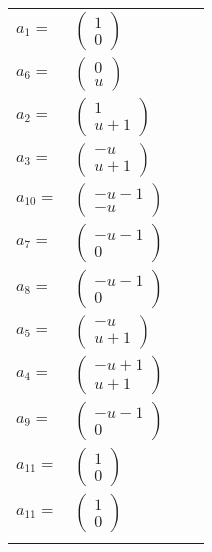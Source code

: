 \documentclass[1p]{elsarticle_modified}
\theoremstyle{definition}
\begin{document}
\begin{tabular}{m{7pt} m{180pt} m{7pt} m{180pt} }
\flushright $a_{1}=$&$\begin{pmatrix}1\\0\end{pmatrix}$ \\
\flushright $a_{6}=$&$\begin{pmatrix}0\\u\end{pmatrix}$ \\
\flushright $a_{2}=$&$\begin{pmatrix}1\\u+1\end{pmatrix}$ \\
\flushright $a_{3}=$&$\begin{pmatrix}- u\\u+1\end{pmatrix}$ \\
\flushright $a_{10}=$&$\begin{pmatrix}- u-1\\- u\end{pmatrix}$ \\
\flushright $a_{7}=$&$\begin{pmatrix}- u-1\\0\end{pmatrix}$ \\
\flushright $a_{8}=$&$\begin{pmatrix}- u-1\\0\end{pmatrix}$ \\
\flushright $a_{5}=$&$\begin{pmatrix}- u\\u+1\end{pmatrix}$ \\
\flushright $a_{4}=$&$\begin{pmatrix}- u+1\\u+1\end{pmatrix}$ \\
\flushright $a_{9}=$&$\begin{pmatrix}- u-1\\0\end{pmatrix}$ \\
\flushright $a_{11}=$&$\begin{pmatrix}1\\0\end{pmatrix}$\\ \flushright $a_{11}=$&$\begin{pmatrix}1\\0\end{pmatrix}$\\&\end{tabular}
\end{document}
